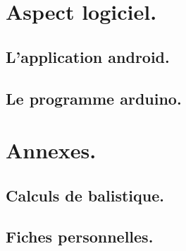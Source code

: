 \documentclass{report}
\begin{document}
\part{Aspect logiciel.}
\chapter{L'application android.} \label{andro}
% 

\chapter{Le programme arduino.} \label{ardui}
% 

\part{Annexes.}
\appendix

\chapter{Calculs de balistique.} \label{balis}
% 

\chapter{Fiches personnelles.}

\newpage
\listoffigures
{}
\end{document}
